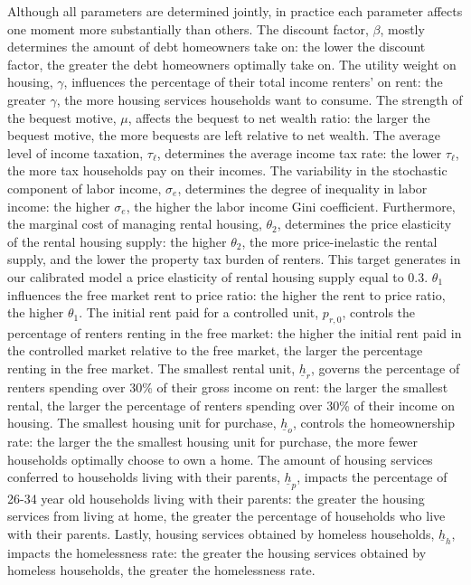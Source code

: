 \documentclass[parskip=full]{article}
\begin{document}
Although all parameters are determined jointly, in practice each parameter affects one moment more substantially than others. The discount factor, $\beta$, mostly determines the amount of debt homeowners take on: the lower the discount factor, the greater the debt homeowners optimally take on. The utility weight on housing, $\gamma$, influences the percentage of their total income renters' on rent: the greater $\gamma$, the more housing services households want to consume. The strength of the bequest motive, $\mu$, affects the bequest to net wealth ratio: the larger the bequest motive, the more bequests are left relative to net wealth. The average level of income taxation, $\tau_{\ell}$, determines the average income tax rate: the lower $\tau_{\ell}$, the more tax households pay on their incomes. The variability in the stochastic component of labor income, $\sigma_{e}$, determines the degree of inequality in labor income: the higher $\sigma_{e}$, the higher the labor income Gini coefficient. Furthermore, the marginal cost of managing rental housing, $\theta_{2}$, determines the price elasticity of the rental housing supply: the higher $\theta_{2}$, the more price-inelastic the rental supply, and the lower the property tax burden of renters. This target generates in our calibrated model a price elasticity of rental housing supply equal to 0.3. $\theta_{1}$ influences the free market rent to price ratio: the higher the rent to price ratio, the higher $\theta_{1}$. The initial rent paid for a controlled unit, $p_{r,0}$, controls the percentage of renters renting in the free market: the higher the initial rent paid in the controlled market relative to the free market, the larger the percentage renting in the free market. The smallest rental unit, $\underline{h}_{r}$, governs the percentage of renters spending over 30\% of their gross income on rent: the larger the smallest rental, the larger the percentage of renters spending over 30\% of their income on housing. The smallest housing unit for purchase, $\underline{h}_{o}$, controls the homeownership rate: the larger the the smallest housing unit for purchase, the more fewer households optimally choose to own a home. The amount of housing services conferred to households living with their parents, $\underline{h}_{p}$, impacts the percentage of 26-34 year old households living with their parents: the greater the housing services from living at home, the greater the percentage of households who live with their parents. Lastly, housing services obtained by homeless households, $\underline{h}_{h}$, impacts the homelessness rate: the greater the housing services obtained by homeless households, the greater the homelessness rate. 
\end{document}
